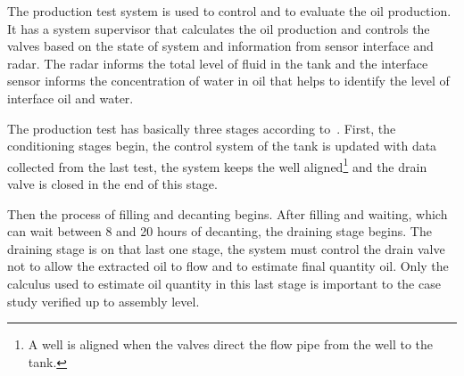 \documentclass[11pt]{article} %
\begin{document}

The production test system is used to control and to evaluate the oil production.
It has a system supervisor that calculates the oil production and controls the
valves based on the state of system and information from sensor interface and
radar. The radar informs the total level of fluid in the tank and the interface sensor
informs the concentration of water in oil that helps to identify the level of
interface oil and water.






The production test has basically three stages according to~\cite{LAUT_SERGIO}.
First, the conditioning stages begin, the control system of the tank is updated
with data collected from the last test, the system keeps the well
aligned\footnote{A well is aligned when the valves direct the flow pipe from the
well to the tank.} and the drain valve is closed in the end of this stage.


Then the process of filling and decanting begins. After filling and waiting,
which can wait between 8 and 20 hours of decanting, the draining stage begins.
The draining stage is on that last one stage, the system must control the drain valve
not to allow the extracted oil to flow and to estimate final quantity oil. Only
the calculus used to estimate oil quantity in this last stage is important to the
case study verified up to assembly level.
\end{document}
